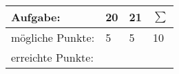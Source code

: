 \documentclass[11pt]{article}
\begin{document}
\begin{center}
\begin{tabular}{|L{3cm}|C{1cm}|C{1cm}|C{1cm}|}
\hline
Aufgabe:&20 & 21 & $\sum$\\
\hline
mögliche Punkte: & 5 & 5 & 10 \\
\hline
erreichte Punkte: &  &  & \\
\hline
\end{tabular}
\end{center}



\end{document}
